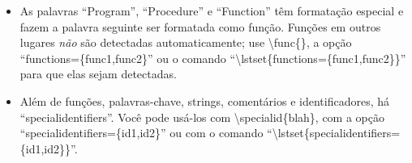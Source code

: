 \begin{itemize}
    \item As palavras ``Program'', ``Procedure'' e ``Function'' têm formatação
          especial e fazem a palavra seguinte ser formatada como função.
          Funções em outros lugares \emph{não} são detectadas automaticamente;
          use \textsf{\textbackslash{}func\{\}}, a opção ``\textsf{functions=\{func1,func2\}}''
          ou o comando ``\textsf{\textbackslash{}lstset\{functions=\{func1,func2\}\}}''
          para que elas sejam detectadas.

    \item Além de funções, palavras-chave, strings, comentários e
          identificadores, há ``\textsf{specialidentifiers}''. Você pode
          usá-los com \textsf{\textbackslash{}specialid\{blah\}}, com a opção
          ``\textsf{specialidentifiers=\{id1,id2\}}'' ou com o comando
          ``\textsf{\textbackslash{}lstset\{specialidentifiers=\{id1,id2\}\}}''.

\end{itemize}


